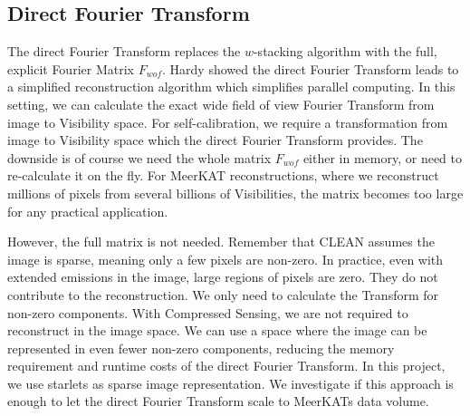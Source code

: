 \subsection{Direct Fourier Transform}
The direct Fourier Transform replaces the $w$-stacking algorithm with the full, explicit Fourier Matrix $F_{wof}$. Hardy\cite{hardy2013direct} showed the direct Fourier Transform leads to a simplified reconstruction algorithm which simplifies parallel computing. In this setting, we can calculate the exact wide field of view Fourier Transform from image to Visibility space. For self-calibration, we require a transformation from image to Visibility space which the direct Fourier Transform provides. The downside is of course we need the whole matrix $F_{wof}$ either in memory, or need to re-calculate it on the fly. For MeerKAT reconstructions, where we reconstruct millions of pixels from several billions of Visibilities, the matrix becomes too large for any practical application.

However, the full matrix is not needed. Remember that CLEAN assumes the image is sparse, meaning only a few pixels are non-zero. In practice, even with extended emissions in the image, large regions of pixels are zero. They do not contribute to the reconstruction. We only need to calculate the Transform for non-zero components. With Compressed Sensing, we are not required to reconstruct in the image space. We can use a space where the image can be represented in even fewer non-zero components, reducing the memory requirement and runtime costs of the direct Fourier Transform. In this project, we use starlets as sparse image representation. We investigate if this approach is enough to let the direct Fourier Transform scale to MeerKATs data volume. 

